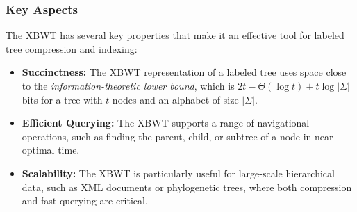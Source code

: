 \subsubsection{Key Aspects}
The XBWT has several key properties that make it an effective tool for labeled tree compression and indexing:
\begin{itemize}
    \item \textbf{Succinctness:} The XBWT representation of a labeled tree uses space close to the \emph{information-theoretic lower bound}, which is \( 2t - \Theta(\log t) + t \log |\Sigma| \) bits for a tree with $t$ nodes and an alphabet of size $|\Sigma|$.
    \item \textbf{Efficient Querying:} The XBWT supports a range of navigational operations, such as finding the parent, child, or subtree of a node in near-optimal time.
    \item \textbf{Scalability:} The XBWT is particularly useful for large-scale hierarchical data, such as XML documents or phylogenetic trees, where both compression and fast querying are critical.
\end{itemize}

